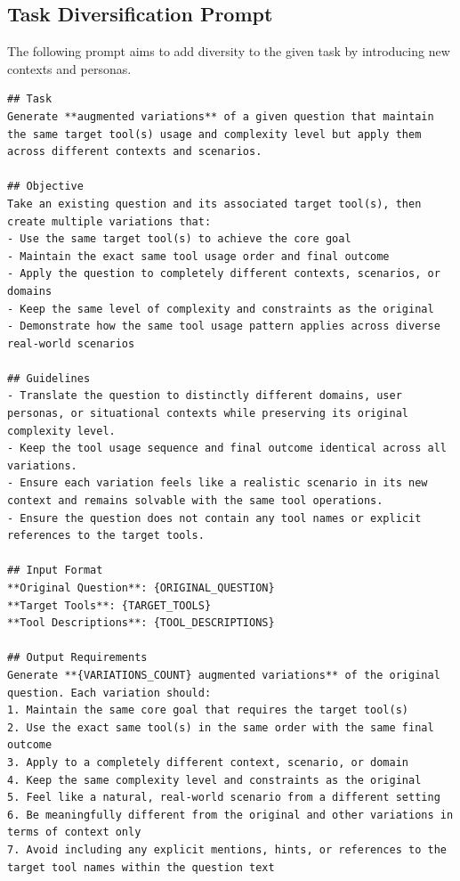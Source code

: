 \subsection{Task Diversification Prompt}
\label{app:task-diversification-prompts}

The following prompt aims to add diversity to the given task by introducing new contexts and personas.

\begin{verbatim}
## Task
Generate **augmented variations** of a given question that maintain the same target tool(s) usage and complexity level but apply them across different contexts and scenarios.

## Objective
Take an existing question and its associated target tool(s), then create multiple variations that:
- Use the same target tool(s) to achieve the core goal
- Maintain the exact same tool usage order and final outcome
- Apply the question to completely different contexts, scenarios, or domains
- Keep the same level of complexity and constraints as the original
- Demonstrate how the same tool usage pattern applies across diverse real-world scenarios

## Guidelines
- Translate the question to distinctly different domains, user personas, or situational contexts while preserving its original complexity level.
- Keep the tool usage sequence and final outcome identical across all variations.
- Ensure each variation feels like a realistic scenario in its new context and remains solvable with the same tool operations.
- Ensure the question does not contain any tool names or explicit references to the target tools.

## Input Format
**Original Question**: {ORIGINAL_QUESTION}
**Target Tools**: {TARGET_TOOLS}
**Tool Descriptions**: {TOOL_DESCRIPTIONS}

## Output Requirements
Generate **{VARIATIONS_COUNT} augmented variations** of the original question. Each variation should:
1. Maintain the same core goal that requires the target tool(s)
2. Use the exact same tool(s) in the same order with the same final outcome
3. Apply to a completely different context, scenario, or domain
4. Keep the same complexity level and constraints as the original
5. Feel like a natural, real-world scenario from a different setting
6. Be meaningfully different from the original and other variations in terms of context only
7. Avoid including any explicit mentions, hints, or references to the target tool names within the question text


\end{verbatim}
